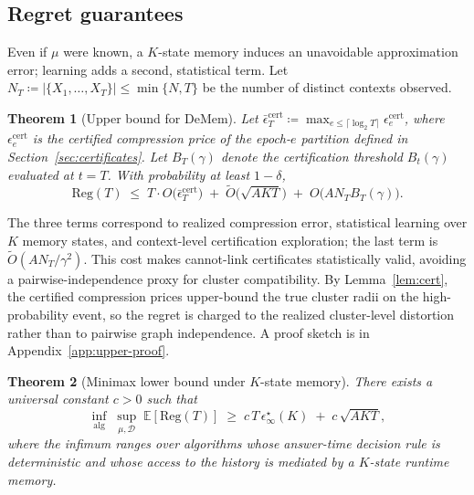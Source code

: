 \documentclass{article}
\theoremstyle{plain}
\newtheorem{theorem}{Theorem}
\theoremstyle{definition}
\theoremstyle{remark}
\newcommand{\cD}{\mathcal{D}}
\newcommand{\eps}{\epsilon}
\newcommand{\EE}{\mathbb{E}}
\newcommand{\Reg}{\mathrm{Reg}}
\begin{document}
\subsection{Regret guarantees}
\label{sec:regret}
\vspace{-0.3em}
Even if $\mu$ were known, a $K$-state memory induces an unavoidable
approximation error; learning adds a second, statistical term.
Let $N_T\coloneqq|\{X_1,\dots,X_T\}|\le\min\{N,T\}$ be the number of distinct
contexts observed.

\begin{theorem}[Upper bound for DeMem]
\label{thm:upper}
Let \(\bar\eps^{\mathrm{cert}}_T
\coloneqq
\max_{e\le\lceil\log_2 T\rceil}\eps^{\mathrm{cert}}_e\), where
\(\eps^{\mathrm{cert}}_e\) is the certified compression price of the
epoch-\(e\) partition defined in Section~\ref{sec:certificates}. Let
\(B_T(\gamma)\) denote the certification threshold \(B_t(\gamma)\) evaluated
at \(t=T\). With probability at least \(1-\delta\),
\begin{equation}
\label{eq:upper}
\Reg(T)
\;\le\;
T\cdot O\!\bigl(\bar\eps^{\mathrm{cert}}_T\bigr)
\;+\;
\tilde O\!\bigl(\sqrt{AKT}\bigr)
\;+\;
O\!\bigl(A N_T B_T(\gamma)\bigr).
\end{equation}
\end{theorem}

The three terms correspond to realized compression error, statistical
learning over \(K\) memory states, and context-level certification
exploration; the last term is \(\tilde O(A N_T/\gamma^2)\). This cost makes cannot-link certificates statistically valid, avoiding a pairwise-independence proxy for cluster compatibility. By
Lemma~\ref{lem:cert}, the certified compression prices upper-bound the true
cluster radii on the high-probability event, so the regret is charged to the
realized cluster-level distortion rather than to pairwise graph
independence. A proof sketch is in Appendix~\ref{app:upper-proof}.

\begin{theorem}[Minimax lower bound under $K$-state memory]
\label{thm:lower}
There exists a universal constant $c>0$ such that
\begin{equation}
\label{eq:lower}
\inf_{\mathrm{alg}}\;\sup_{\mu,\cD}\;
\EE[\Reg(T)]
\;\ge\;
c\,T\,\eps^\star_\infty(K)
\;+\;
c\,\sqrt{AKT},
\end{equation}
where the infimum ranges over algorithms whose answer-time decision rule is
deterministic and whose access to the history is mediated by a \(K\)-state
runtime memory.
\end{theorem}
\end{document}
